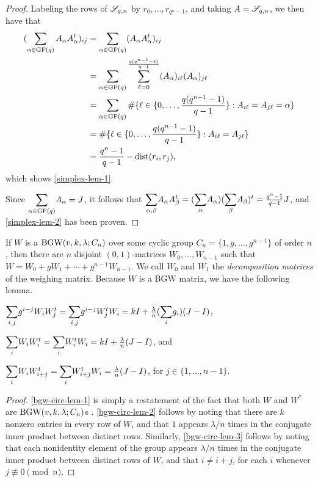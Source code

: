\documentclass[../../../main]{subfiles}
\begin{document}
 \begin{proof}
  Labeling the rows of $\mathscr{S}_{q,n}$ by $r_0,\dots,r_{q^n-1}$, and taking $A=\mathscr{S}_{q,n}$, we then have that
  \begin{align*}
   (\sum_{\alpha\in\text{GF}(q)} A_\alpha A_\alpha^t)_{ij} &= \sum_{\alpha\in\text{GF}(q)}(A_\alpha A_\alpha^t)_{ij} \\
   &= \sum_{\alpha\in\text{GF}(q)} \sum_{\ell=0}^{\frac{q(q^{n-1}-1)}{q-1}}(A_\alpha)_{i\ell}(A_\alpha)_{j\ell} \\
   &= \sum_{\alpha\in\text{GF}(q)} \#\{\ell \in \{0,\dots,\frac{q(q^{n-1}-1)}{q-1}\} : A_{i\ell}=A_{j\ell}=\alpha\} \\
   &= \#\{\ell \in \{0,\dots,\frac{q(q^{n-1}-1)}{q-1}\} : A_{i\ell}=A_{j\ell}\} \\
   &= \frac{q^n-1}{q-1} - \text{dist}(r_i,r_j),
  \end{align*}
  which shows \ref{simplex-lem-1}.
  
  Since $\ssum_{\alpha\in\gf(q)}A_\alpha=J$, it follows that $\ssum_{\alpha,\beta}A_\alpha A_\beta^t = (\ssum_\alpha A_\alpha)(\ssum_\beta A_\beta)^t = \frac{q^n-1}{q-1}J$, and \ref{simplex-lem-2} has been proven.
 \end{proof}
 
 If $W$ is a $\text{BGW}(v,k,\lambda;C_n)$ over some cyclic group $C_n=\{1,g,\dots,g^{n-1}\}$ of order $n$, then there are $n$ disjoint $(0,1)$-matrices $W_0, \dots, W_{n-1}$ such that $W=W_0 + gW_1 + \cdots + g^{n-1}W_{n-1}$. We call $W_0$ and $W_1$ the {\it decomposition matrices} of the weighing matrix. Because $W$ is a BGW matrix, we have the following lemma.
 
 \begin{lem}\label{bgw-circ-lem}
  \begin{defenum}
   \item[]
   \item\label{bgw-circ-lem-1} $\ssum_{i,j}g^{i-j}W_iW_j^t = \ssum_{i,j}g^{i-j}W_j^tW_i = kI + \frac{\lambda}{n}(\ssum_ig_i)(J-I)$,
   \item\label{bgw-circ-lem-2} $\ssum_iW_iW_i^t = \ssum_iW_i^tW_i = kI +\frac{\lambda}{n}(J-I)$, and
   \item\label{bgw-circ-lem-3} $\ssum_iW_iW_{i+j}^t = \ssum_iW_{i+j}^tW_i = \frac{\lambda}{n}(J-I)$, for $j \in \{1,\dots,n-1\}$.
  \end{defenum}
 \end{lem}

 \begin{proof}
   \ref{bgw-circ-lem-1} is simply a restatement of the fact that both $W$ and $W^*$ are $\text{BGW}(v,k,\lambda;C_n)$s \cite[see][]{combinatorics-of-symmetric-designs}. \ref{bgw-circ-lem-2} follows by noting that there are $k$ nonzero entries in every row of $W$, and that $1$ appears $\lambda/n$ times in the conjugate inner product between distinct rows. Similarly, \ref{bgw-circ-lem-3} follows by noting that each nonidentity element of the group appears $\lambda/n$ times in the conjugate inner product between distinct rows of $W$, and that $i \neq i+j$, for each $i$ whenever $j \not\equiv 0 \pmod{n}$.
 \end{proof}
\end{document}
